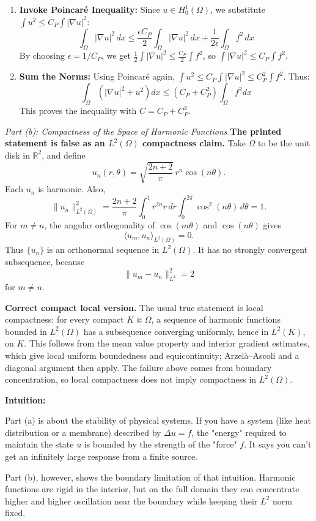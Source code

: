 \begin{solution}
\begin{enumerate}
    \item \textbf{Invoke Poincaré Inequality:} Since $u \in H_0^1(\Omega)$, we substitute $\int u^2 \leq C_P \int |\nabla u|^2$:
    \[ \int_\Omega |\nabla u|^2 \, dx \leq \frac{\epsilon C_P}{2} \int_\Omega |\nabla u|^2 \, dx + \frac{1}{2\epsilon} \int_\Omega f^2 \, dx \]
    By choosing $\epsilon = 1/C_P$, we get $\frac{1}{2} \int |\nabla u|^2 \leq \frac{C_P}{2} \int f^2$, so $\int |\nabla u|^2 \leq C_P \int f^2$.

    \item \textbf{Sum the Norms:} Using Poincaré again, $\int u^2 \leq C_P \int |\nabla u|^2 \leq C_P^2 \int f^2$. Thus:
    \[ \int_\Omega (|\nabla u|^2 + u^2) dx \leq (C_P + C_P^2) \int_\Omega f^2 dx \]
    This proves the inequality with $C = C_P + C_P^2$.
\end{enumerate}

\textit{Part (b): Compactness of the Space of Harmonic Functions}
\textbf{The printed statement is false as an $L^2(\Omega)$ compactness claim.}
Take \(\Omega\) to be the unit disk in \(\mathbb R^2\), and define
\[
u_n(r,\theta)=\sqrt{\frac{2n+2}{\pi}}\,r^n\cos(n\theta).
\]
Each \(u_n\) is harmonic. Also,
\[
\|u_n\|_{L^2(\Omega)}^2
=\frac{2n+2}{\pi}\int_0^1r^{2n}r\,dr
\int_0^{2\pi}\cos^2(n\theta)\,d\theta
=1.
\]
For \(m\neq n\), the angular orthogonality of \(\cos(m\theta)\) and \(\cos(n\theta)\) gives
\[
\langle u_m,u_n\rangle_{L^2(\Omega)}=0.
\]
Thus \(\{u_n\}\) is an orthonormal sequence in \(L^2(\Omega)\). It has no strongly convergent subsequence, because
\[
\|u_m-u_n\|_{L^2}^2=2
\]
for \(m\neq n\).

\textbf{Correct compact local version.}
The usual true statement is local compactness: for every compact \(K\Subset\Omega\), a sequence of harmonic functions bounded in \(L^2(\Omega)\) has a subsequence converging uniformly, hence in \(L^2(K)\), on \(K\). This follows from the mean value property and interior gradient estimates, which give local uniform boundedness and equicontinuity; Arzel\`a--Ascoli and a diagonal argument then apply. The failure above comes from boundary concentration, so local compactness does not imply compactness in \(L^2(\Omega)\).
\par\medskip
\textbf{Intuition:}
\par\medskip
Part (a) is about the stability of physical systems. If you have a system (like heat distribution or a membrane) described by $\Delta u = f$, the "energy" required to maintain the state $u$ is bounded by the strength of the "force" $f$. It says you can't get an infinitely large response from a finite source.
\par\medskip
Part (b), however, shows the boundary limitation of that intuition. Harmonic functions are rigid in the interior, but on the full domain they can concentrate higher and higher oscillation near the boundary while keeping their \(L^2\) norm fixed.
\end{solution}
